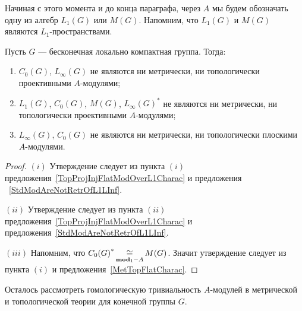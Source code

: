 Начиная с этого момента и до конца параграфа, через $A$ мы будем обозначать одну
из алгебр $L_1(G)$ или $M(G)$. Напомним, что $L_1(G)$ и $M(G)$ являются
$L_1$-пространствами.

\begin{proposition}\label{StdModAreNotL1MGMetTopProj} Пусть $G$ --- бесконечная
локально компактная группа. Тогда:

\begin{enumerate}[label = (\roman*)]
    \item $C_0(G)$, $L_\infty(G)$ не являются ни метрически, ни топологически
    проективными $A$-модулями;

    \item $L_1(G)$, $C_0(G)$, $M(G)$, ${L_\infty(G)}^*$ не являются 
    ни метрически, ни топологически проективными $A$-модулями;

    \item $L_\infty(G)$, $C_0(G)$ не являются ни метрически, ни топологически
    плоскими $A$-модулями.
\end{enumerate}
\end{proposition}
\begin{proof} $(i)$ Утверждение следует из пункта $(i)$
предложения~\ref{TopProjInjFlatModOverL1Charac} и предложения
~\ref{StdModAreNotRetrOfL1LInf}.

$(ii)$ Утверждение следует из пункта $(ii)$
предложения~\ref{TopProjInjFlatModOverL1Charac} и
предложения~\ref{StdModAreNotRetrOfL1LInf}.

$(iii)$ Напомним, что ${C_0(G)}^*\mathop{\mathbin{\cong}}\limits_{\mathbf{mod}_1-A}M(G)$. 
Значит утверждение следует из пункта $(i)$ и предложения~\ref{MetTopFlatCharac}.
\end{proof}

Осталось рассмотреть гомологическую тривиальность $A$-модулей в метрической и
топологической теории для конечной группы $G$.

